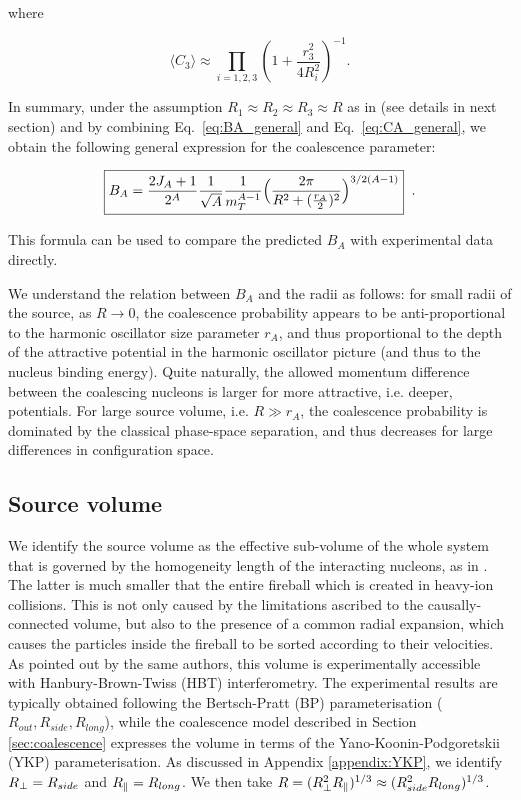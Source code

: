 \documentclass[a4paper,11pt]{scrartcl}
\begin{document}
\noindent where

 \begin{equation}
\langle C_{3} \rangle \approx \prod_{i=1,2,3} \left(1 + \frac{r_{3}^2}{4R_{i}^2} \right)^{-1}.
\label{eq:C3}
\end{equation}
 
In summary, under the assumption $R_1\approx R_2 \approx R_3 \approx R$ as in \cite{Blum:2017qnn} (see details in next section) and by combining Eq.~\ref{eq:BA_general} and Eq.~\ref{eq:CA_general}, we obtain the following general expression for the coalescence parameter:

\begin{equation}
	\boxed {  B_{A} = {2J_{A} + 1 \over 2^{A}} {1 \over \sqrt{A}} {1 \over m_{T}^{A-1}} \Bigl({2\pi \over R^2 + ({r_A \over 2})^2 }\Bigr)^{3/2(A-1)} } \;\; .
\end{equation}

\noindent This formula can be used to compare the predicted $B_{A}$ with experimental data directly.
 
We understand the relation between $B_A$ and the radii as follows: for small radii of the source, as $R \rightarrow 0$, the coalescence probability appears to be anti-proportional to the harmonic oscillator size parameter $r_A$, and thus proportional to the depth of the attractive potential in the harmonic oscillator picture (and thus to the nucleus binding energy).
Quite naturally, the allowed momentum difference between the coalescing nucleons is larger for more attractive, i.e. deeper, potentials. 
For large source volume, i.e. $R \gg r_A$, the coalescence probability is dominated by the classical phase-space separation, and thus decreases for large differences in configuration space. 

\subsection{Source volume}
\label{SecSourceVolume}
We identify the source volume as the effective sub-volume of the whole system that is governed by the homogeneity length of the interacting nucleons, as in \cite{Scheibl:1998tk}. 
The latter is much smaller that the entire fireball which is created in heavy-ion collisions. 
This is not only caused by the limitations ascribed to the causally-connected volume, but also to the presence of a common radial expansion, which causes the particles inside the fireball to be sorted according to their velocities.
As pointed out by the same authors, this volume is experimentally accessible with Hanbury-Brown-Twiss (HBT) interferometry. 
The experimental results are typically obtained following the Bertsch-Pratt (BP) parameterisation ($R_{out}, R_{side}, R_{long}$), while the coalescence model described in Section \ref{sec:coalescence} expresses the volume in terms of the Yano-Koonin-Podgoretskii (YKP) parameterisation. 
As discussed in Appendix \ref{appendix:YKP}, we identify $R_{\perp} = R_{side}$ and $R_{\|} = R_{long}$. We then take $R = (R_{\perp}^{2}R_{\|})^{1/3} \approx (R_{side}^{2}R_{long})^{1/3}$.
\end{document}
